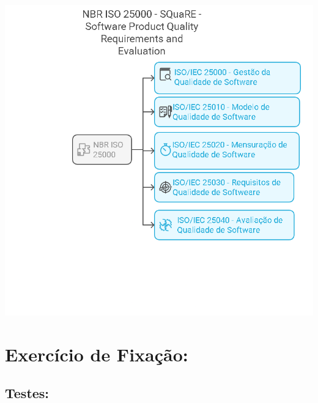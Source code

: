 \documentclass[
]{book}
\begin{document}
\includegraphics{images/qualidade-geral/ISO-25000-SQuaRE.png}

\section{Exercício de Fixação:}\label{exercuxedcio-de-fixauxe7uxe3o}

\subsection{Testes:}\label{testes}
\end{document}
